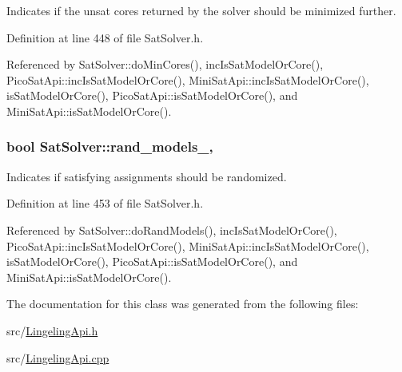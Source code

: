 Indicates if the unsat cores returned by the solver should be minimized further. 



Definition at line 448 of file Sat\-Solver.\-h.



Referenced by Sat\-Solver\-::do\-Min\-Cores(), inc\-Is\-Sat\-Model\-Or\-Core(), Pico\-Sat\-Api\-::inc\-Is\-Sat\-Model\-Or\-Core(), Mini\-Sat\-Api\-::inc\-Is\-Sat\-Model\-Or\-Core(), is\-Sat\-Model\-Or\-Core(), Pico\-Sat\-Api\-::is\-Sat\-Model\-Or\-Core(), and Mini\-Sat\-Api\-::is\-Sat\-Model\-Or\-Core().

\hypertarget{classSatSolver_a73fed24d8fb4da85ef82dc53ac5f28c7}{
\subsubsection[{rand\-\_\-models\-\_\-}]{\setlength{\rightskip}{0pt plus 5cm}bool Sat\-Solver\-::rand\-\_\-models\-\_\-\hspace{0.3cm}{\ttfamily [protected]}, {\ttfamily [inherited]}}}\label{classSatSolver_a73fed24d8fb4da85ef82dc53ac5f28c7}


Indicates if satisfying assignments should be randomized. 



Definition at line 453 of file Sat\-Solver.\-h.



Referenced by Sat\-Solver\-::do\-Rand\-Models(), inc\-Is\-Sat\-Model\-Or\-Core(), Pico\-Sat\-Api\-::inc\-Is\-Sat\-Model\-Or\-Core(), Mini\-Sat\-Api\-::inc\-Is\-Sat\-Model\-Or\-Core(), is\-Sat\-Model\-Or\-Core(), Pico\-Sat\-Api\-::is\-Sat\-Model\-Or\-Core(), and Mini\-Sat\-Api\-::is\-Sat\-Model\-Or\-Core().



The documentation for this class was generated from the following files\-:\begin{DoxyCompactItemize}
\item 
src/\hyperlink{LingelingApi_8h}{Lingeling\-Api.\-h}\item 
src/\hyperlink{LingelingApi_8cpp}{Lingeling\-Api.\-cpp}\end{DoxyCompactItemize}
